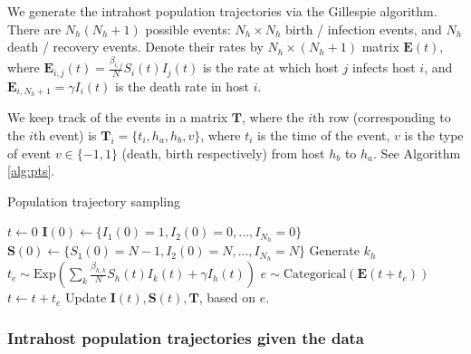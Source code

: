 \documentclass[a4paper,18pt]{report}
\begin{document}
We generate the intrahost population trajectories via the Gillespie algorithm. There are $N_h(N_h+1)$ possible events:
$N_h \times N_h$ birth / infection events, and  $N_h$ death / recovery events. Denote their rates by $N_h \times (N_h+1)$ matrix $\mathbf{E}(t)$,
where $\mathbf{E}_{i,j}(t)=\frac{\beta_{i,j}}{N}S_i(t)I_j(t)$ is the rate at which host $j$ infects host $i$, and $\mathbf{E}_{i,N_h+1} = \gamma I_i(t)$ is the death rate in host $i$.

We keep track of the events in a matrix $\mathbf{T}$, where the $i$th row (corresponding to the $i$th event) is $\mathbf{T}_i=\{t_i, h_a, h_b, v\}$, where $t_i$ is the time of the event,
$v$ is the type of event $v \in \{-1,1\}$ (death, birth respectively) from host $h_b$ to $h_a$. See Algorithm \ref{alg:pts}.
\begin{algorithm}
\caption{Population trajectory sampling \label{alg:pts}}
\begin{algorithmic}
\STATE $t\gets 0$
\STATE $\mathbf{I}(0)\gets\{I_1(0)=1, I_2(0)=0, ..., I_{N_h}=0\}$
\STATE $\mathbf{S}(0)\gets\{S_1(0)=N-1, I_2(0)=N, ..., I_{N_h}=N\}$
\STATE Generate $k_h$
\STATE $t_e \sim \textrm{Exp}(\sum_k \frac{\beta_{h,k}}{N}S_h(t)I_k(t) + \gamma I_h(t))$ 
\STATE $e \sim \text{Categorical}(\mathbf{E}(t+t_e))$  
\STATE $t \gets t+t_e$
\STATE Update $\mathbf{I}(t), \mathbf{S}(t), \mathbf{T}$, based on $e$.
\ENDWHILE
\end{algorithmic}
\end{algorithm}

\subsubsection{Intrahost population trajectories given the data}
\end{document}
